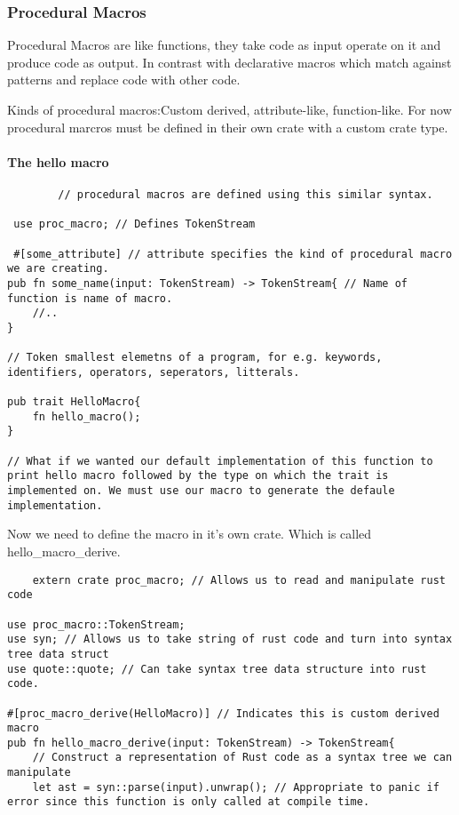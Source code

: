\subsubsection{Procedural Macros}

Procedural Macros are like functions, they take code as input operate on it and produce code as output. In contrast with declarative macros which match against patterns and replace code with other code.

Kinds of procedural macros:Custom derived, attribute-like, function-like. For now procedural marcros must be defined in their own crate with a custom crate type.


\begin{example}
    \item \paragraph*{The hello macro}\begin{lstlisting}
        // procedural macros are defined using this similar syntax.

 use proc_macro; // Defines TokenStream

 #[some_attribute] // attribute specifies the kind of procedural macro we are creating. 
pub fn some_name(input: TokenStream) -> TokenStream{ // Name of function is name of macro.
    //..
}

// Token smallest elemetns of a program, for e.g. keywords, identifiers, operators, seperators, litterals.

pub trait HelloMacro{
    fn hello_macro();
}

// What if we wanted our default implementation of this function to print hello macro followed by the type on which the trait is implemented on. We must use our macro to generate the defaule implementation.
\end{lstlisting}

Now we need to define the macro in it's own crate. Which is called hello\_macro\_derive.\begin{lstlisting}
    extern crate proc_macro; // Allows us to read and manipulate rust code

use proc_macro::TokenStream;
use syn; // Allows us to take string of rust code and turn into syntax tree data struct
use quote::quote; // Can take syntax tree data structure into rust code.

#[proc_macro_derive(HelloMacro)] // Indicates this is custom derived macro
pub fn hello_macro_derive(input: TokenStream) -> TokenStream{
    // Construct a representation of Rust code as a syntax tree we can manipulate
    let ast = syn::parse(input).unwrap(); // Appropriate to panic if error since this function is only called at compile time.


\end{lstlisting}
\end{example}
